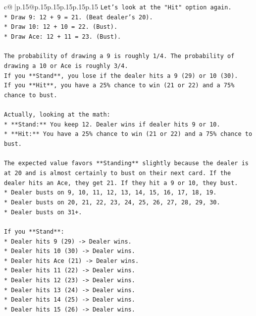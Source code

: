 \documentclass{article}
\begin{document}
{\begin{supertabular}{c@{$\;$}|p{.15\linewidth}@{}p{.15\linewidth}p{.15\linewidth}p{.15\linewidth}p{.15\linewidth}p{.15\linewidth}}
{{{\texttt{Let's look at the "Hit" option again.} \\
\texttt{*   Draw 9: 12 + 9 = 21. (Beat dealer's 20).} \\
\texttt{*   Draw 10: 12 + 10 = 22. (Bust).} \\
\texttt{*   Draw Ace: 12 + 11 = 23. (Bust).} \\
\\ 
\texttt{The probability of drawing a 9 is roughly 1/4. The probability of drawing a 10 or Ace is roughly 3/4.} \\
\texttt{If you **Stand**, you lose if the dealer hits a 9 (29) or 10 (30).} \\
\texttt{If you **Hit**, you have a 25\% chance to win (21 or 22) and a 75\% chance to bust.} \\
\\ 
\texttt{Actually, looking at the math:} \\
\texttt{*   **Stand:** You keep 12. Dealer wins if dealer hits 9 or 10.} \\
\texttt{*   **Hit:** You have a 25\% chance to win (21 or 22) and a 75\% chance to bust.} \\
\\ 
\texttt{The expected value favors **Standing** slightly because the dealer is at 20 and is almost certainly to bust on their next card. If the dealer hits an Ace, they get 21. If they hit a 9 or 10, they bust.} \\
\texttt{*   Dealer busts on 9, 10, 11, 12, 13, 14, 15, 16, 17, 18, 19.} \\
\texttt{*   Dealer busts on 20, 21, 22, 23, 24, 25, 26, 27, 28, 29, 30.} \\
\texttt{*   Dealer busts on 31+.} \\
\\ 
\texttt{If you **Stand**:} \\
\texttt{*   Dealer hits 9 (29) {-}> Dealer wins.} \\
\texttt{*   Dealer hits 10 (30) {-}> Dealer wins.} \\
\texttt{*   Dealer hits Ace (21) {-}> Dealer wins.} \\
\texttt{*   Dealer hits 11 (22) {-}> Dealer wins.} \\
\texttt{*   Dealer hits 12 (23) {-}> Dealer wins.} \\
\texttt{*   Dealer hits 13 (24) {-}> Dealer wins.} \\
\texttt{*   Dealer hits 14 (25) {-}> Dealer wins.} \\
\texttt{*   Dealer hits 15 (26) {-}> Dealer wins.} \\
}}}
\end{supertabular}}
\end{document}
